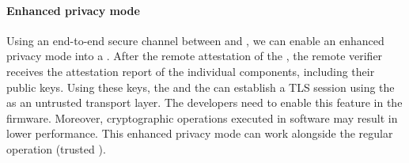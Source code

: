 \paragraph{Enhanced privacy mode} Using an end-to-end secure channel between \app and \sphw, we can enable an enhanced privacy mode into a \nameenclave. After the remote attestation of the \nameenclave, the remote verifier receives the attestation report of the individual components, including their public keys. Using these keys, the \app and the \sphw can establish a TLS session using the \ce as an untrusted transport layer. The developers need to enable this feature in the \sphw firmware. Moreover, cryptographic operations executed in software may result in lower performance. This enhanced privacy mode can work alongside the regular operation (trusted \ce). 

